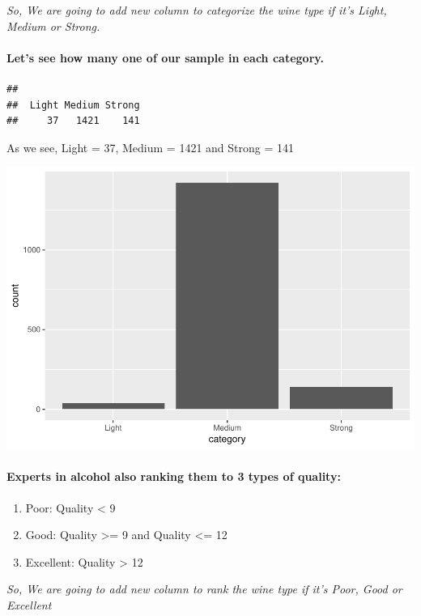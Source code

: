\documentclass[]{article}
\let\oldparagraph\paragraph
\renewcommand{\paragraph}[1]{\oldparagraph{#1}\mbox{}}
\begin{document}
\emph{So, We are going to add new column to categorize the wine type if
it's Light, Medium or Strong.}

\paragraph{Let's see how many one of our sample in each
category.}\label{lets-see-how-many-one-of-our-sample-in-each-category.}

\begin{verbatim}
## 
##  Light Medium Strong 
##     37   1421    141
\end{verbatim}

As we see, Light = 37, Medium = 1421 and Strong = 141

\includegraphics{RedWine_files/figure-latex/Disiplay_QPlot_Category-1.pdf}

\paragraph{Experts in alcohol also ranking them to 3 types of
quality:}\label{experts-in-alcohol-also-ranking-them-to-3-types-of-quality}

\begin{enumerate}
\def\labelenumi{\arabic{enumi}.}
\item
  Poor: Quality \textless{} 9
\item
  Good: Quality \textgreater{}= 9 and Quality \textless{}= 12
\item
  Excellent: Quality \textgreater{} 12
\end{enumerate}

\emph{So, We are going to add new column to rank the wine type if it's
Poor, Good or Excellent}
\end{document}
